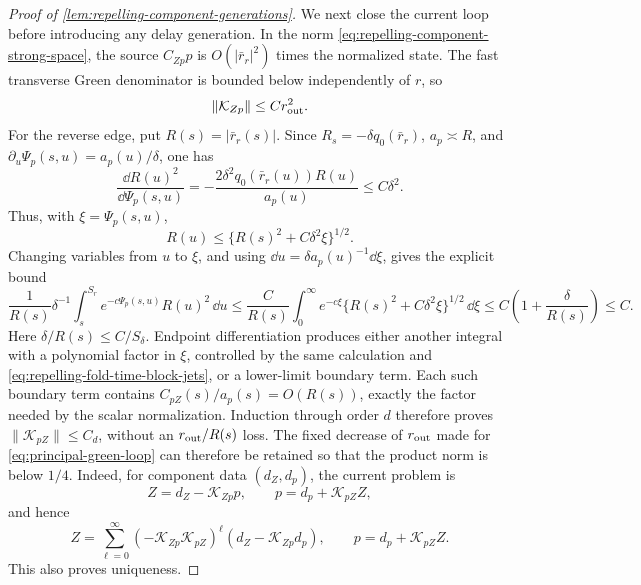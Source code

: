 \begin{proof}[Proof of
\cref{lem:repelling-component-generations}]
We next close the current loop before introducing any delay generation.
In the norm \cref{eq:repelling-component-strong-space}, the source
\(C_{Zp}p\) is \(O(|\bar r_r|^2)\) times the normalized state.  The fast
transverse Green denominator is bounded below independently of \(r\), so
\begin{equation}
 \|\mathcal K_{Zp}\|\le Cr_{\rm out}^2.             \label{eq:repelling-KZp-proof}
\end{equation}
For the reverse edge, put \(R(s)=|\bar r_r(s)|\).  Since
\(R_s=-\delta q_0(\bar r_r)\), \(a_p\asymp R\), and
\(\partial_u\Psi_p(s,u)=a_p(u)/\delta\), one has
\begin{equation}
 \frac{\dd R(u)^2}{\dd\Psi_p(s,u)}
 =-\frac{2\delta^2q_0(\bar r_r(u))R(u)}{a_p(u)}
 \le C\delta^2.                                     \label{eq:repelling-radius-action-motion}
\end{equation}
Thus, with \(\xi=\Psi_p(s,u)\),
\[
 R(u)\le\{R(s)^2+C\delta^2\xi\}^{1/2}.
\]
Changing variables from \(u\) to \(\xi\), and using
\(\dd u=\delta a_p(u)^{-1}\dd\xi\), gives the explicit bound
\begin{equation}
 \frac1{R(s)}\delta^{-1}
 \int_s^{S_r}e^{-c\Psi_p(s,u)}
       R(u)^2\,\dd u
 \le\frac C{R(s)}
       \int_0^\infty e^{-c\xi}
          \{R(s)^2+C\delta^2\xi\}^{1/2}\,\dd\xi
 \le C\left(1+\frac{\delta}{R(s)}\right)\le C.      \label{eq:repelling-KpZ-integral}
\end{equation}
Here \(\delta/R(s)\le C/S_\delta\).  Endpoint differentiation produces
either another integral with a polynomial factor in \(\xi\), controlled by
the same calculation and
\cref{eq:repelling-fold-time-block-jets}, or a lower-limit boundary term.
Each such boundary term contains
\(C_{pZ}(s)/a_p(s)=O(R(s))\), exactly the factor needed by the scalar
normalization.  Induction through order \(d\) therefore proves
\(\|\mathcal K_{pZ}\|\le C_d\), without an
\(r_{\rm out}/R(s)\) loss.  The fixed decrease of
\(r_{\rm out}\) made for \cref{eq:principal-green-loop} can therefore be
retained so that the product norm is below \(1/4\).  Indeed, for component
data \((d_Z,d_p)\), the current problem is
\[
 Z=d_Z-\mathcal K_{Zp}p,\qquad
 p=d_p+\mathcal K_{pZ}Z,
\]
and hence
\begin{equation}
 Z=\sum_{\ell=0}^\infty
   (-\mathcal K_{Zp}\mathcal K_{pZ})^\ell
       (d_Z-\mathcal K_{Zp}d_p),\qquad
 p=d_p+\mathcal K_{pZ}Z.                           \label{eq:repelling-current-loop-series}
\end{equation}
This also proves uniqueness.


\end{proof}

